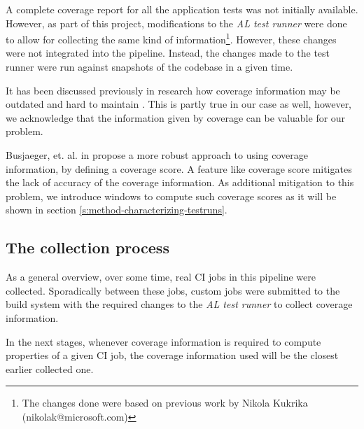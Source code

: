 A complete coverage report for all the application tests was not initially available. However, as 
part of this project, modifications to the \emph{AL test runner} were done to allow 
for collecting the same kind of information\footnote{The changes done were based on 
previous work by Nikola Kukrika (nikolak@microsoft.com)}. However, these changes were not 
integrated into the pipeline. Instead, the changes made to the test runner were run against snapshots of 
the codebase in a given time.

It has been discussed previously in research how coverage information may be
outdated and hard to maintain \cite{Bertolino2020LearningtoRankVR}. This is 
partly true in our case as well, however, we acknowledge that the information 
given by coverage can be valuable for our problem.

Busjaeger, et. al. in \cite{Busjaeger2016LearningFT} propose a more robust approach to using coverage information, by defining
a coverage score. A feature like coverage score mitigates the lack of accuracy 
of the coverage information. As additional mitigation to this problem, we introduce
windows to compute such coverage scores as it will be shown in section \ref{s:method-characterizing-testruns}.

\subsection{The collection process}

As a general overview, over some time, real CI jobs in this pipeline were collected. 
Sporadically between these jobs, custom jobs were submitted to the build system with the required changes
to the \emph{AL test runner} to collect coverage information. 

In the next stages, whenever coverage information is required to compute properties of a given CI job,
the coverage information used will be the closest earlier collected one.
